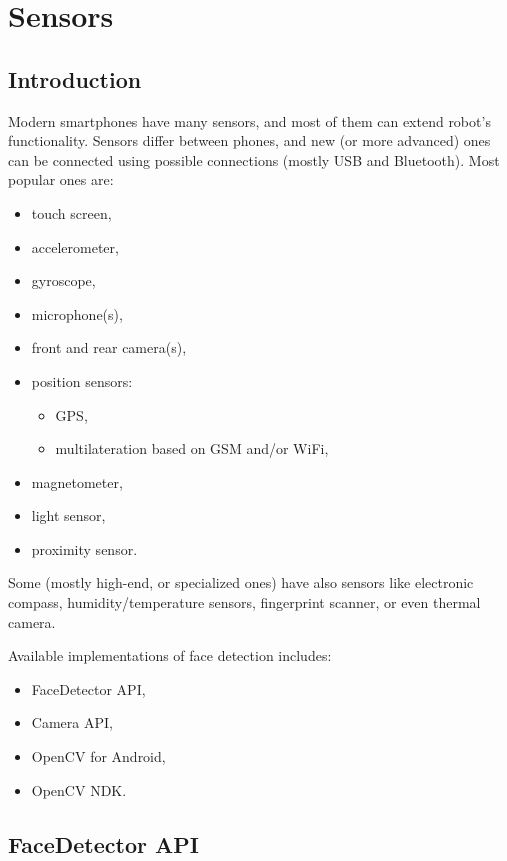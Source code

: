 \chapter{Sensors}

\section{Introduction}
Modern smartphones have many sensors, and most of them can extend robot's
functionality.
Sensors differ between phones, and new (or more advanced) ones can
be connected using possible connections (mostly USB and Bluetooth).
Most popular ones are:
\begin{itemize}
  \item touch screen,
  \item accelerometer,
  \item gyroscope,
  \item microphone(s),
  \item front and rear camera(s),
  \item position sensors:
  \begin{itemize}
    \item GPS,
    \item multilateration based on GSM and/or WiFi,
  \end{itemize}
  \item magnetometer,
  \item light sensor,
  \item proximity sensor.
\end{itemize}
Some (mostly high-end, or specialized ones) have also sensors like electronic
compass, humidity/temperature sensors, fingerprint scanner, or even thermal
camera.

Available implementations of face detection includes:
\begin{itemize}
  \item FaceDetector API,
  \item Camera API,
  \item OpenCV for Android,
  \item OpenCV NDK.
\end{itemize}


\section{FaceDetector API}

